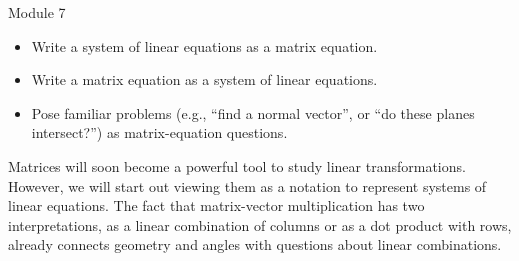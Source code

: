 \documentclass{workbook}
\begin{document}
\begin{lesson}

	Module 7

	\begin{itemize}
		\item Write a system of linear equations as a matrix equation.
		\item Write a matrix equation as a system of linear equations.
		\item Pose familiar problems (e.g., ``find a normal vector'', or
			``do these planes intersect\mbox{?}'') as matrix-equation
			questions.
	\end{itemize}

	Matrices will soon become a powerful tool to study linear transformations.
	However, we will start out viewing them as a notation to represent
	systems of linear equations. The fact that matrix-vector multiplication
	has two interpretations, as a linear combination of columns or as a dot product
	with rows, already connects geometry and angles with questions about linear combinations.

\end{lesson}
\end{document}
